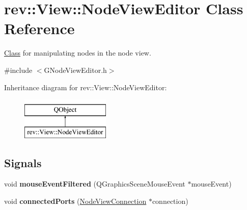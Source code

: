 \hypertarget{classrev_1_1_view_1_1_node_view_editor}{}\section{rev\+::View\+::Node\+View\+Editor Class Reference}
\label{classrev_1_1_view_1_1_node_view_editor}


\mbox{\hyperlink{struct_class}{Class}} for manipulating nodes in the node view.  




{\ttfamily \#include $<$G\+Node\+View\+Editor.\+h$>$}

Inheritance diagram for rev\+::View\+::Node\+View\+Editor\+:\begin{figure}[H]
\begin{center}
\leavevmode
\includegraphics[height=2.000000cm]{classrev_1_1_view_1_1_node_view_editor}
\end{center}
\end{figure}
\subsection*{Signals}
\begin{DoxyCompactItemize}
\item 
\mbox{\label{classrev_1_1_view_1_1_node_view_editor_ad641defe10408055ca3d5926913385b1}} 
void {\bfseries mouse\+Event\+Filtered} (Q\+Graphics\+Scene\+Mouse\+Event $\ast$mouse\+Event)
\item 
\mbox{\label{classrev_1_1_view_1_1_node_view_editor_afae3d23deffeed4312ceff5e23b51852}} 
void {\bfseries connected\+Ports} (\mbox{\hyperlink{classrev_1_1_view_1_1_node_view_connection}{Node\+View\+Connection}} $\ast$connection)
\end{DoxyCompactItemize}
